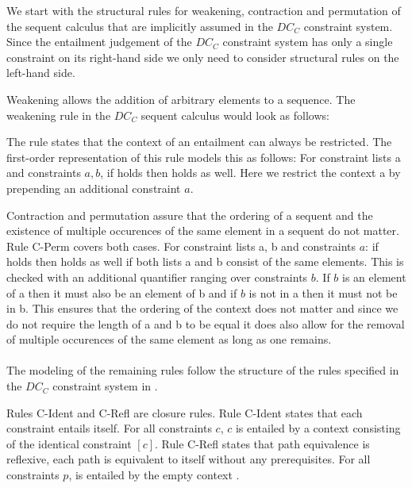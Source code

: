 We start with the structural rules for weakening, contraction and permutation
of the sequent calculus that are implicitly assumed in the $DC_C$ constraint system.
Since the entailment judgement of the $DC_C$ constraint system
has only a single constraint on its right-hand side
we only need to consider structural rules on the left-hand side.

Weakening allows the addition of arbitrary elements to a sequence.
The weakening rule in the $DC_C$ sequent calculus would look as follows:
\begin{prooftree}
\end{prooftree}
The rule states that the context of an entailment can always be restricted.
The first-order representation of this rule models this as follows:
For constraint lists \ovl a and constraints $a, b$,
if  holds then  holds as well.
Here we restrict the context \ovl a by prepending an additional constraint $a$.

Contraction and permutation assure that the ordering of a sequent
and the existence of multiple occurences of the same element in a sequent
do not matter. Rule C-Perm covers both cases.
For constraint lists \ovl a, \ovl b and constraints $a$:
if  holds then  holds as well
if both lists \ovl a and \ovl b consist of the same elements.
This is checked with an additional quantifier ranging over constraints $b$.
If $b$ is an element of \ovl a then it must also be an element of \ovl b
and if $b$ is not in \ovl a then it must not be in \ovl b.
This ensures that the ordering of the context does not matter
and since we do not require the length of \ovl a and \ovl b to be equal
it does also allow for the removal of multiple occurences of the same element
as long as one remains.
\\\\
The modeling of the remaining rules follow the structure of the rules
specified in the $DC_C$ constraint system in .

Rules C-Ident and C-Refl are closure rules.
Rule C-Ident states that each constraint entails itself.
For all constraints $c$, $c$ is entailed by a context consisting
of the identical constraint $[c]$.
Rule C-Refl states that path equivalence is reflexive,
each path is equivalent to itself without any prerequisites.
For all constraints $p$,  is entailed by the empty context \nil.

